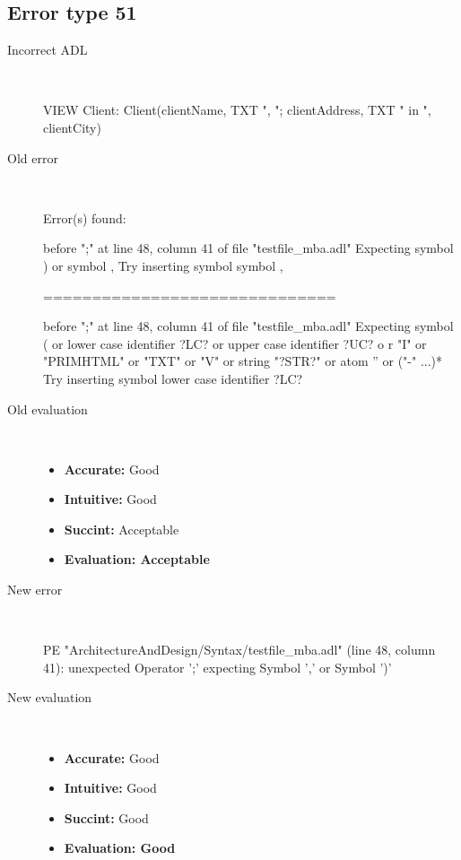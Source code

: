 \hrulefill

\subsection{Error type 51}
  \begin{description}
  \item[Incorrect ADL]~\\
\begin{adl}
VIEW Client: Client(clientName, TXT ", "; clientAddress, TXT " in ", clientCity)\end{adl}
  \item[Old error]~\\
\begin{haskell}
Error(s) found:

before ";" at line 48, column 41 of file "testfile_mba.adl"
Expecting symbol ) or symbol ,
Try inserting symbol symbol ,

==============================

before ";" at line 48, column 41 of file "testfile_mba.adl"
Expecting symbol ( or lower case identifier ?LC? or upper case identifier ?UC? o
r "I" or "PRIMHTML" or "TXT" or "V" or string "?STR?" or atom '' or ("-" ...)*
Try inserting symbol lower case identifier ?LC?
\end{haskell}
  \item[Old evaluation]~\\
    \begin{itemize}
    \item \textbf{Accurate:} Good
    \item \textbf{Intuitive:} Good
    \item \textbf{Succint:} Acceptable
    \item \textbf{Evaluation: Acceptable}
    \end{itemize}
  \item[New error]~\\
\begin{haskell}
PE "ArchitectureAndDesign/Syntax/testfile_mba.adl" (line 48, column 41):
unexpected Operator ';'
expecting Symbol ',' or Symbol ')'\end{haskell}
  \item[New evaluation]~\\
    \begin{itemize}
    \item \textbf{Accurate:} Good
    \item \textbf{Intuitive:} Good
    \item \textbf{Succint:} Good
    \item \textbf{Evaluation: Good
}
    \end{itemize}
  \end{description}

